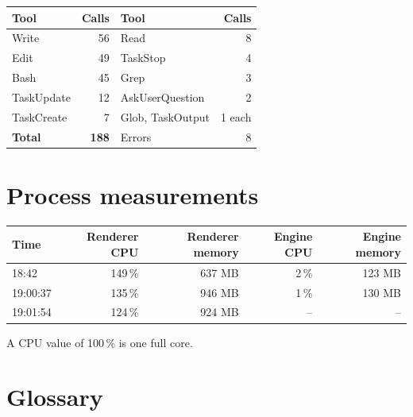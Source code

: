 \documentclass[11pt,a4paper]{article}
\begin{document}
\begin{center}
\begin{tabular}{@{}lr@{\qquad}lr@{}}
\toprule
Tool & Calls & Tool & Calls \\
\midrule
Write & 56 & Read & 8 \\
Edit & 49 & TaskStop & 4 \\
Bash & 45 & Grep & 3 \\
TaskUpdate & 12 & AskUserQuestion & 2 \\
TaskCreate & 7 & Glob, TaskOutput & 1 each \\
\midrule
\textbf{Total} & \textbf{188} & Errors & 8 \\
\bottomrule
\end{tabular}
\end{center}

\section{Process measurements}

\begin{center}
\begin{tabular}{@{}lrrrr@{}}
\toprule
Time & Renderer CPU & Renderer memory & Engine CPU & Engine memory \\
\midrule
18:42 & 149\,\% & 637 MB & 2\,\% & 123 MB \\
19:00:37 & 135\,\% & 946 MB & 1\,\% & 130 MB \\
19:01:54 & 124\,\% & 924 MB & -- & -- \\
\bottomrule
\end{tabular}
\end{center}
A CPU value of 100\,\% is one full core.

\section{Glossary}
\end{document}
